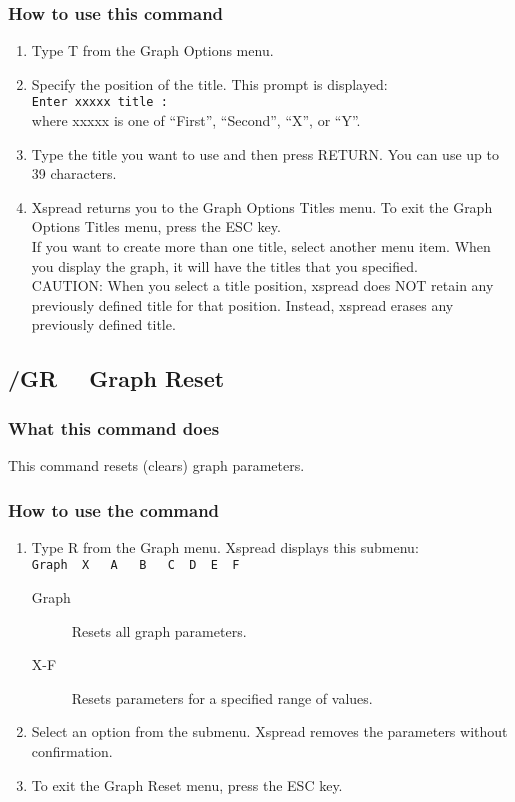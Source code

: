 \subsubsection*{How to use this command}
\begin{enumerate}
\item{Type T from the Graph Options menu.}
\item{Specify the position of the title.  This prompt is displayed:\\
        {\tt Enter xxxxx title :}\\
        where xxxxx is one of ``First'', ``Second'', ``X'', or ``Y''.}
\item{Type the title you want to use and then press RETURN.  You can use
        up to 39 characters.}
\item{Xspread returns you to the Graph Options Titles menu.  To exit the
        Graph Options Titles menu, press the ESC key.\\
        If you want to create more than one title, select another menu item.
        When you display the graph, it will have the titles that you
        specified.\\
        CAUTION:  When you select a title position, xspread does NOT retain
        any previously defined title for that position.  Instead, xspread
        erases any previously defined title.}
\end{enumerate}
            
\subsection*{/GR \ \     Graph Reset}

\subsubsection*{What this command does}
This command resets (clears) graph parameters.

\subsubsection*{How to use the command}
\begin{enumerate}
\item{Type R from the Graph menu.  Xspread displays this submenu: \\
  {\tt Graph\ \   X \ \  A \ \  B \ \  C\ \   D\ \   E\ \   F} \\
  \begin{description}
  \item[Graph]{Resets all graph parameters.}
  \item[X-F]{Resets parameters for a specified range of values.}
  \end{description} }
\item{Select an option from the submenu. Xspread removes the parameters
        without confirmation.}
\item{To exit the Graph Reset menu, press the ESC key.}
\end{enumerate}
       

